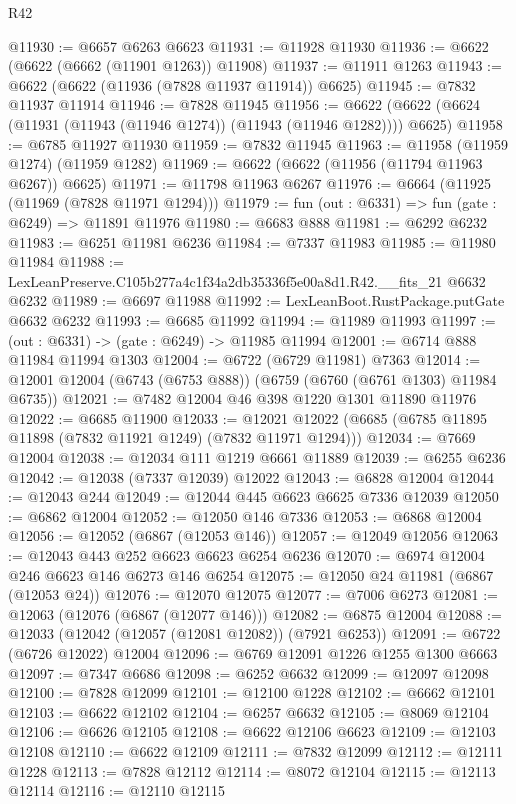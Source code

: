 \begin{lexlean}{R42}
\begin{coremodule}
{@11930 := @6657 @6263 @6623
@11931 := @11928 @11930
@11936 := @6622 (@6622 (@6662 (@11901 @1263)) @11908)
@11937 := @11911 @1263
@11943 := @6622 (@6622 (@11936 (@7828 @11937 @11914)) @6625)
@11945 := @7832 @11937 @11914
@11946 := @7828 @11945
@11956 := @6622 (@6622 (@6624 (@11931 (@11943 (@11946 @1274)) (@11943 (@11946 @1282)))) @6625)
@11958 := @6785 @11927 @11930
@11959 := @7832 @11945
@11963 := @11958 (@11959 @1274) (@11959 @1282)
@11969 := @6622 (@6622 (@11956 (@11794 @11963 @6267)) @6625)
@11971 := @11798 @11963 @6267
@11976 := @6664 (@11925 (@11969 (@7828 @11971 @1294)))
@11979 := fun (out : @6331) => fun (gate : @6249) => @11891 @11976
@11980 := @6683 @888
@11981 := @6292 @6232
@11983 := @6251 @11981 @6236
@11984 := @7337 @11983
@11985 := @11980 @11984
@11988 := LexLeanPreserve.C105b277a4c1f34a2db35336f5e00a8d1.R42.__fits_21 @6632 @6232
@11989 := @6697 @11988
@11992 := LexLeanBoot.RustPackage.putGate @6632 @6232
@11993 := @6685 @11992
@11994 := @11989 @11993
@11997 := (out : @6331) -> (gate : @6249) -> @11985 @11994
@12001 := @6714 @888 @11984 @11994 @1303
@12004 := @6722 (@6729 @11981) @7363
@12014 := @12001 @12004 (@6743 (@6753 @888)) (@6759 (@6760 (@6761 @1303) @11984 @6735))
@12021 := @7482 @12004 @46 @398 @1220 @1301 @11890 @11976
@12022 := @6685 @11900
@12033 := @12021 @12022 (@6685 (@6785 @11895 @11898 (@7832 @11921 @1249) (@7832 @11971 @1294)))
@12034 := @7669 @12004
@12038 := @12034 @111 @1219 @6661 @11889
@12039 := @6255 @6236
@12042 := @12038 (@7337 @12039) @12022
@12043 := @6828 @12004
@12044 := @12043 @244
@12049 := @12044 @445 @6623 @6625 @7336 @12039
@12050 := @6862 @12004
@12052 := @12050 @146 @7336
@12053 := @6868 @12004
@12056 := @12052 (@6867 (@12053 @146))
@12057 := @12049 @12056
@12063 := @12043 @443 @252 @6623 @6623 @6254 @6236
@12070 := @6974 @12004 @246 @6623 @146 @6273 @146 @6254
@12075 := @12050 @24 @11981 (@6867 (@12053 @24))
@12076 := @12070 @12075
@12077 := @7006 @6273
@12081 := @12063 (@12076 (@6867 (@12077 @146)))
@12082 := @6875 @12004
@12088 := @12033 (@12042 (@12057 (@12081 @12082)) (@7921 @6253))
@12091 := @6722 (@6726 @12022) @12004
@12096 := @6769 @12091 @1226 @1255 @1300 @6663
@12097 := @7347 @6686
@12098 := @6252 @6632
@12099 := @12097 @12098
@12100 := @7828 @12099
@12101 := @12100 @1228
@12102 := @6662 @12101
@12103 := @6622 @12102
@12104 := @6257 @6632
@12105 := @8069 @12104
@12106 := @6626 @12105
@12108 := @6622 @12106 @6623
@12109 := @12103 @12108
@12110 := @6622 @12109
@12111 := @7832 @12099
@12112 := @12111 @1228
@12113 := @7828 @12112
@12114 := @8072 @12104
@12115 := @12113 @12114
@12116 := @12110 @12115
}
\end{coremodule}
\end{lexlean}

